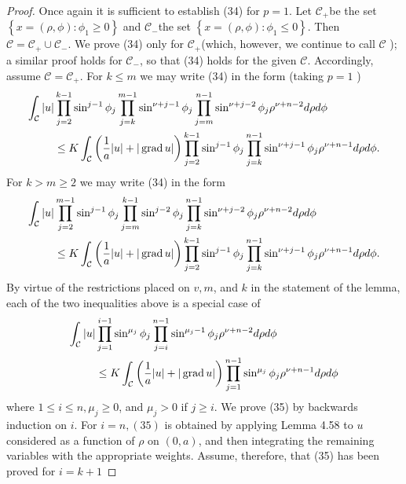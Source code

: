 \begin{proof}
  Once again it is sufficient to establish (34) for $p=1$. Let $\mathcal{C}_{+}$be the set $\left\{x=(\rho, \phi): \phi_1 \geq 0\right\}$ and $\mathcal{C}_{-}$the set $\left\{x=(\rho, \phi): \phi_1 \leq 0\right\}$. Then $\mathcal{C}=\mathcal{C}_{+} \cup \mathcal{C}_{-}$. We prove (34) only for $\mathcal{C}_{+}$(which, however, we continue to call $\mathcal{C}$ ); a similar proof holds for $\mathcal{C}_{-}$, so that (34) holds for the given $\mathcal{C}$. Accordingly, assume $\mathcal{C}=\mathcal{C}_{+}$.
  For $k \leq m$ we may write (34) in the form (taking $p=1$ )
  \[
  \begin{aligned}
  \int_{\mathcal{C}}|u| & \prod_{j=2}^{k-1} \sin ^{j-1} \phi_j \prod_{j=k}^{m-1} \sin ^{\nu+j-1} \phi_j \prod_{j=m}^{n-1} \sin ^{\nu+j-2} \phi_j \rho^{\nu+n-2} d \rho d \phi \\
  & \leq K \int_{\mathcal{C}}\left(\frac{1}{a}|u|+|\operatorname{grad} u|\right) \prod_{j=2}^{k-1} \sin ^{j-1} \phi_j \prod_{j=k}^{n-1} \sin ^{\nu+j-1} \phi_j \rho^{\nu+n-1} d \rho d \phi .
  \end{aligned}
  \]
  For $k>m \geq 2$ we may write (34) in the form
  \[
  \begin{aligned}
  \int_{\mathcal{C}}|u| & \prod_{j=2}^{m-1} \sin ^{j-1} \phi_j \prod_{j=m}^{k-1} \sin ^{j-2} \phi_j \prod_{j=k}^{n-1} \sin ^{\nu+j-2} \phi_j \rho^{\nu+n-2} d \rho d \phi \\
  & \leq K \int_{\mathcal{C}}\left(\frac{1}{a}|u|+|\operatorname{grad} u|\right) \prod_{j=2}^{k-1} \sin ^{j-1} \phi_j \prod_{j=k}^{n-1} \sin ^{\nu+j-1} \phi_j \rho^{\nu+n-1} d \rho d \phi .
  \end{aligned}
  \]
  By virtue of the restrictions placed on $v, m$, and $k$ in the statement of the lemma,
  each of the two inequalities above is a special case of
  \[
  \begin{aligned}
  \int_{\mathcal{C}}|u| & \prod_{j=1}^{i-1} \sin ^{\mu_j} \phi_j \prod_{j=i}^{n-1} \sin ^{\mu_j-1} \phi_j \rho^{\nu+n-2} d \rho d \phi \\
  & \leq K \int_{\mathcal{C}}\left(\frac{1}{a}|u|+|\operatorname{grad} u|\right) \prod_{j=1}^{n-1} \sin ^{\mu_j} \phi_j \rho^{\nu+n-1} d \rho d \phi
  \end{aligned}
  \]
  where $1 \leq i \leq n, \mu_j \geq 0$, and $\mu_j>0$ if $j \geq i$.
  We prove (35) by backwards induction on $i$. For $i=n,(35)$ is obtained by applying Lemma 4.58
  to $u$ considered as a function of $\rho$ on $(0, a)$, and then integrating the remaining 
  variables with the appropriate weights. Assume, therefore, that (35) has been proved for $i=k+1$ 

\end{proof}
